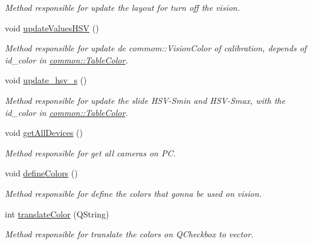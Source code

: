 \begin{DoxyCompactItemize}
\begin{DoxyCompactList}\small\item\em Method responsible for update the layout for turn off the vision. \end{DoxyCompactList}\item 
\hypertarget{classMainWindow_aee8cb88ae764bcfb12963ab2a1fa9e65}{void \hyperlink{classMainWindow_aee8cb88ae764bcfb12963ab2a1fa9e65}{update\-Values\-H\-S\-V} ()}\label{classMainWindow_aee8cb88ae764bcfb12963ab2a1fa9e65}

\begin{DoxyCompactList}\small\item\em Method responsible for update de commom\-::\-Vision\-Color of calibration, depends of id\-\_\-color in \hyperlink{structcommon_1_1TableColor}{common\-::\-Table\-Color}. \end{DoxyCompactList}\item 
\hypertarget{classMainWindow_a6a418df110068fb09bd60ce785c05926}{void \hyperlink{classMainWindow_a6a418df110068fb09bd60ce785c05926}{update\-\_\-hsv\-\_\-s} ()}\label{classMainWindow_a6a418df110068fb09bd60ce785c05926}

\begin{DoxyCompactList}\small\item\em Method responsible for update the slide H\-S\-V-\/\-Smin and H\-S\-V-\/\-Smax, with the id\-\_\-color in \hyperlink{structcommon_1_1TableColor}{common\-::\-Table\-Color}. \end{DoxyCompactList}\item 
void \hyperlink{classMainWindow_a0ec10b5c5cd98c5aa086bf91793c9d7e}{get\-All\-Devices} ()
\begin{DoxyCompactList}\small\item\em Method responsible for get all cameras on P\-C. \end{DoxyCompactList}\item 
\hypertarget{classMainWindow_a62c1577587f33bc89c823d3ea3f23bda}{void \hyperlink{classMainWindow_a62c1577587f33bc89c823d3ea3f23bda}{define\-Colors} ()}\label{classMainWindow_a62c1577587f33bc89c823d3ea3f23bda}

\begin{DoxyCompactList}\small\item\em Method responsible for define the colors that gonna be used on vision. \end{DoxyCompactList}\item 
\hypertarget{classMainWindow_a7d8385cfb0a4a1bbb38ac943010962d9}{int \hyperlink{classMainWindow_a7d8385cfb0a4a1bbb38ac943010962d9}{translate\-Color} (Q\-String)}\label{classMainWindow_a7d8385cfb0a4a1bbb38ac943010962d9}

\begin{DoxyCompactList}\small\item\em Method responsible for translate the colors on Q\-Checkbox to vector. \end{DoxyCompactList}\end{DoxyCompactItemize}
